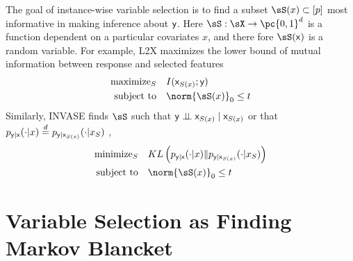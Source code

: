 \documentclass[11pt]{article}
\begin{document}
The goal of instance-wise variable selection is to find a subset $\sS(x)\subset[p]$ most informative in making inference about $\mathsf{y}$. Here $\sS:\sX\to\pc{0,1}^d$ is a function dependent on a particular covariates $x$, and there fore $\sS(\rx)$ is a random variable. For example, L2X maximizes the lower bound of mutual information between response and selected features \cite{kindermansLearningHowExplain2017}
\begin{align}
    \text{maximize}_{S} 
        \quad& I(\rx_{S(x)};\ry) \nonumber \\
    \text{subject to}
        \quad& \norm{\sS(x)}_0 \leq t \nonumber
\end{align}
Similarly, INVASE finds $\sS$ such that $\mathsf{y} \perp\!\!\!\perp \mathsf{x}_{S(x)} \mid \mathsf{x}_{S(x)}$ or that $p_{\mathsf{y}|\mathsf{x}}(\cdot|x) \overset{d}{=} p_{\mathsf{y}|\mathsf{x}_{S(x)}}(\cdot|x_S)$ \cite{yoonINVASEInstancewiseVariable2018},
\begin{align}
    \text{minimize}_{S} 
        \quad& KL\left( p_{\ry|\rx}(\cdot|x) \Vert p_{\ry|\rx_{S(x)}}(\cdot|x_S)  \right) \nonumber \\
    \text{subject to}
        \quad& \norm{\sS(x)}_0 \leq t \nonumber
\end{align}






\section{Variable Selection as Finding Markov Blancket}
\end{document}
